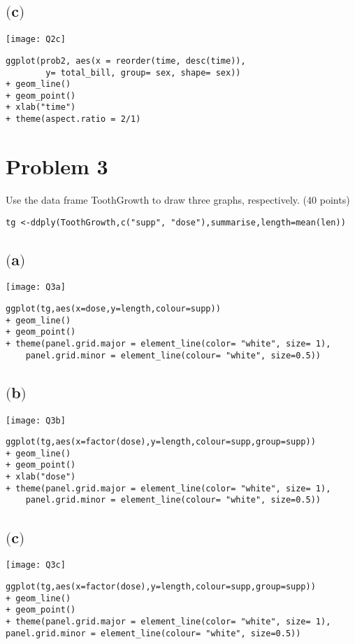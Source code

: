 \documentclass[a4paper,man,natbib]{apa6}
\begin{document}
\subsection{$($c$)$}
\texttt{[image: Q2c]}
\begin{verbatim}
ggplot(prob2, aes(x = reorder(time, desc(time)), 
		y= total_bill, group= sex, shape= sex)) 
+ geom_line() 
+ geom_point() 
+ xlab("time") 
+ theme(aspect.ratio = 2/1)
\end{verbatim}

\newpage
\section{Problem 3}
Use the data frame ToothGrowth to draw three graphs, respectively. (40 points)
\begin{verbatim}
tg <-ddply(ToothGrowth,c("supp", "dose"),summarise,length=mean(len))
\end{verbatim}

\subsection{$($a$)$}
\texttt{[image: Q3a]}
\begin{verbatim}
ggplot(tg,aes(x=dose,y=length,colour=supp)) 
+ geom_line() 
+ geom_point() 
+ theme(panel.grid.major = element_line(color= "white", size= 1), 
	panel.grid.minor = element_line(colour= "white", size=0.5))
\end{verbatim}

\subsection{$($b$)$}
\texttt{[image: Q3b]}
\begin{verbatim}
ggplot(tg,aes(x=factor(dose),y=length,colour=supp,group=supp)) 
+ geom_line() 
+ geom_point() 
+ xlab("dose")
+ theme(panel.grid.major = element_line(color= "white", size= 1), 
	panel.grid.minor = element_line(colour= "white", size=0.5)) 
\end{verbatim}

\subsection{$($c$)$}
\texttt{[image: Q3c]}
\begin{verbatim}
ggplot(tg,aes(x=factor(dose),y=length,colour=supp,group=supp)) 
+ geom_line() 
+ geom_point() 
+ theme(panel.grid.major = element_line(color= "white", size= 1), panel.grid.minor = element_line(colour= "white", size=0.5))
\end{verbatim}
\end{document}
